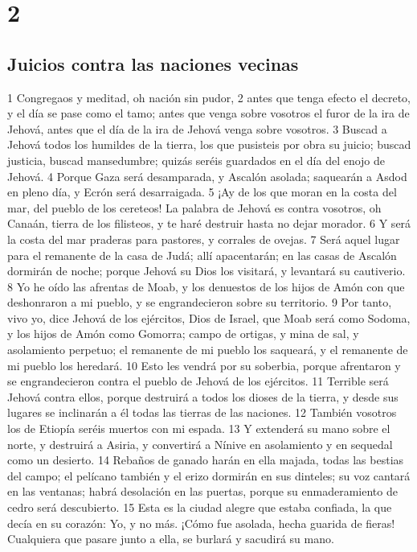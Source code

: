 \chapter{2}

\section*{Juicios contra las naciones vecinas}

1 Congregaos y meditad, oh nación sin pudor,
2 antes que tenga efecto el decreto, y el día se pase como el tamo; antes que venga sobre vosotros el furor de la ira de Jehová, antes que el día de la ira de Jehová venga sobre vosotros.
3 Buscad a Jehová todos los humildes de la tierra, los que pusisteis por obra su juicio; buscad justicia, buscad mansedumbre; quizás seréis guardados en el día del enojo de Jehová.
4 Porque Gaza será desamparada, y Ascalón asolada; saquearán a Asdod en pleno día, y Ecrón será desarraigada.
5 ¡Ay de los que moran en la costa del mar, del pueblo de los cereteos! La palabra de Jehová es contra vosotros, oh Canaán, tierra de los filisteos,  y te haré destruir hasta no dejar morador.
6 Y será la costa del mar praderas para pastores, y corrales de ovejas.
7 Será aquel lugar para el remanente de la casa de Judá; allí apacentarán; en las casas de Ascalón dormirán de noche; porque Jehová su Dios los visitará, y levantará su cautiverio.
8 Yo he oído las afrentas de Moab,  y los denuestos de los hijos de Amón con que deshonraron a mi pueblo, y se engrandecieron sobre su territorio.
9 Por tanto, vivo yo, dice Jehová de los ejércitos, Dios de Israel, que Moab será como Sodoma, y los hijos de Amón como Gomorra; campo de ortigas, y mina de sal, y asolamiento perpetuo; el remanente de mi pueblo los saqueará, y el remanente de mi pueblo los heredará.
10 Esto les vendrá por su soberbia, porque afrentaron y se engrandecieron contra el pueblo de Jehová de los ejércitos.
11 Terrible será Jehová contra ellos, porque destruirá a todos los dioses de la tierra, y desde sus lugares se inclinarán a él todas las tierras de las naciones.
12 También vosotros los de Etiopía seréis muertos con mi espada.
13 Y extenderá su mano sobre el norte, y destruirá a Asiria, y convertirá a Nínive en asolamiento y en sequedal como un desierto.
14 Rebaños de ganado harán en ella majada, todas las bestias del campo; el pelícano también y el erizo dormirán en sus dinteles; su voz cantará en las ventanas; habrá desolación en las puertas, porque su enmaderamiento de cedro será descubierto.
15 Esta es la ciudad alegre que estaba confiada, la que decía en su corazón: Yo, y no más. ¡Cómo fue asolada, hecha guarida de fieras! Cualquiera que pasare junto a ella, se burlará y sacudirá su mano.

